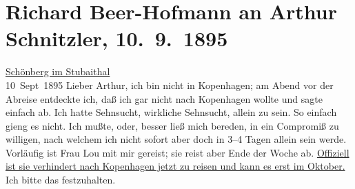 

         
         \renewcommand{\erwaehntePersonen}{Personen: Lou Andreas-Salomé, Richard Beer-Hofmann, Auguste Glümer}
         \renewcommand{\erwaehnteOrte}{Orte: Brenner, Gasthaus Jagerhof, Innsbruck, Kopenhagen, Schönberg im Stubaital, Wien}
         \renewcommand{\erwaehnteWerke}{}
               \section[Richard Beer-Hofmann an Arthur Schnitzler, 10. 9. 1895]{ Richard Beer-Hofmann an Arthur Schnitzler, 10. 9. 1895}\nopagebreak{}\rehead{ }\begin{ledgroupsized}[t]{13cm}\normalsize\beginnumbering{} \toendnotes[C]{\smallbreak\pagebreak[2]} 
\pstart
           \raggedleft{}{\pb}\uline{Schönberg im Stubaithal}{\\}10 Sept 1895\pend
           \pstart
           Lieber Arthur, ich bin nicht in Kopenhagen; am Abend vor der Abreise entdeckte ich, daß ich gar nicht nach
                  Kopenhagen wollte und sagte einfach ab. Ich
               hatte Sehnsucht, wirkliche Sehnsucht, allein zu sein. So einfach gieng es nicht. Ich
               mußte, oder, besser ließ mich bereden, in ein Compromiß zu willigen,  nach welchem ich nicht sofort aber doch in 3–4
               Tagen allein sein werde. Vorläufig ist {\pb}Frau Lou mit mir gereist; sie reist aber Ende der Woche ab. \uline{Offiziell ist sie verhindert nach Kopenhagen jetzt zu reisen und kann es erst im Oktober.}
               Ich bitte das festzuhalten.\pend

\end{ledgroupsized}
